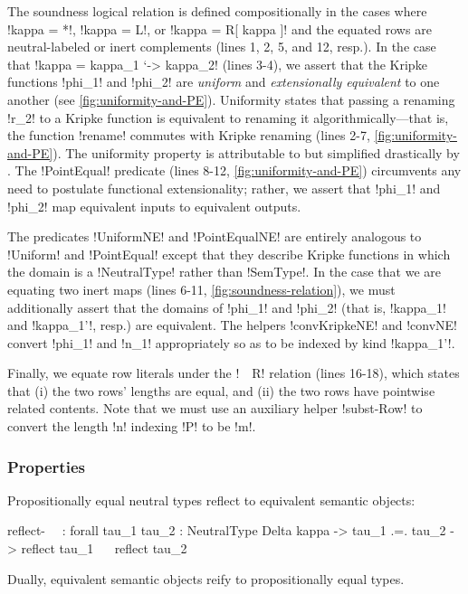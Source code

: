 \documentclass[sigplan,10pt,anonymous,review]{acmart}\settopmatter{printfolios=true,printccs=false,printacmref=false}
\begin{document}
The soundness logical relation is defined compositionally in the cases where !kappa = *!, !kappa = L!, or !kappa = R[ kappa ]! and the equated rows are neutral-labeled or inert complements (lines 1, 2, 5, and 12, resp.). In the case that !kappa = kappa_1 `-> kappa_2! (lines 3-4), we assert that the Kripke functions !phi_1! and !phi_2! are \emph{uniform} and \emph{extensionally equivalent} to one another (see \cref{fig:uniformity-and-PE}). Uniformity states that passing a renaming !r_2! to a Kripke function is equivalent to renaming it algorithmically---that is, the function !rename! commutes with Kripke renaming (lines 2-7, \cref{fig:uniformity-and-PE}). The uniformity property is attributable to \citet{AllaisBM13} but simplified drastically by \citet{ChapmanKNW19}. The !PointEqual! predicate (lines 8-12, \cref{fig:uniformity-and-PE}) circumvents any need to postulate functional extensionality; rather, we assert that !phi_1! and !phi_2! map equivalent inputs to equivalent outputs.

The predicates !UniformNE! and !PointEqualNE! are entirely analogous to !Uniform! and !PointEqual! except that they describe Kripke functions in which the domain is a !NeutralType! rather than !SemType!. In the case that we are equating two inert maps (lines 6-11, \cref{fig:soundness-relation}), we must additionally assert that the domains of !phi_1! and !phi_2! (that is, !kappa_1! and !kappa_1'!, resp.) are equivalent. The helpers !convKripkeNE! and !convNE! convert !phi_1! and !n_1! appropriately so as to be indexed by kind !kappa_1'!.

Finally, we equate row literals under the !~~R! relation (lines 16-18), which states that (i) the two rows' lengths are equal, and (ii) the two rows have pointwise related contents.  Note that we must use an auxiliary helper !subst-Row! to convert the length !n! indexing !P! to be !m!.

\subsubsection{Properties}

Propositionally equal neutral types reflect to equivalent semantic objects: 

\begin{agda}
reflect-~~ : forall {tau_1 tau_2 : NeutralType Delta kappa} -> 
             tau_1 .=. tau_2 -> reflect tau_1 ~~ reflect tau_2
\end{agda}

\Ni Dually, equivalent semantic objects reify to propositionally equal types. 
\end{document}
